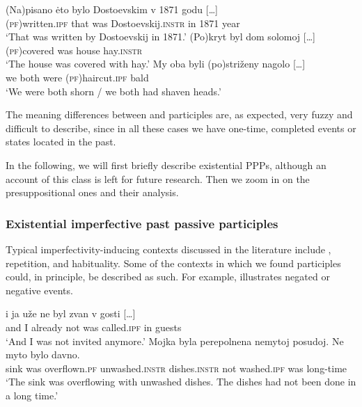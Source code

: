 \documentclass[output=paper,modfonts,newtxmath,hidelinks
\ChapterDOI{10.5281/zenodo.2545513}
]{langscibook}
\begin{document}
\ea\label{pisanoPF}
\ea\gll	(Na)pisano \.{e}to bylo Dostoevskim v 1871 godu [\dots]\\ 
	(\textsc{pf})written.\textsc{ipf} that was Dostoevskij.\textsc{instr} in 1871 year \\
\glt	`That was written by Dostoevskij in 1871.'
\ex\gll	(Po)kryt byl dom solomoj [\dots]\\ 		
	\textsc{(pf)}covered was house hay.\textsc{instr} 	\\
\glt	`The house was covered with hay.'
\ex\gll	My oba byli (po)striženy nagolo [\dots]\\
	we both were (\textsc{pf})haircut.\textsc{ipf} bald\\
\glt	`We were both shorn / we both had shaven heads.'
\z\z

\noindent The meaning differences between  and  participles are, as expected, very fuzzy and difficult to describe, since in all these cases we have one-time, completed events or states located in the past. 

In the following,  we will first briefly describe existential  PPPs, although an account of this class is left for future research. Then we  zoom in on the presuppositional ones and their analysis.

\subsubsection{Existential imperfective past passive participles}

Typical imperfectivity-inducing contexts discussed in the literature include , repetition, and habituality. Some of the contexts in which we found  participles could, in principle, be described as such. For example,  illustrates negated or negative events. 

\ea\label{negOF}
\ea\gll	[\dots] i ja uže ne byl zvan v gosti [\dots]\\
	{} and I already not was called.\textsc{ipf} in guests \\
\glt `And I was not invited anymore.' 
\ex\gll	Mojka byla perepolnena nemytoj posudoj. Ne myto bylo davno.\\
   	sink was overflown.\textsc{pf} unwashed.\textsc{instr} dishes.\textsc{instr} not washed.\textsc{ipf} was long-time\\
\glt	`The sink was overflowing with unwashed dishes. The dishes had not been done in a long time.'\label{17c}
\z\z
\end{document}
